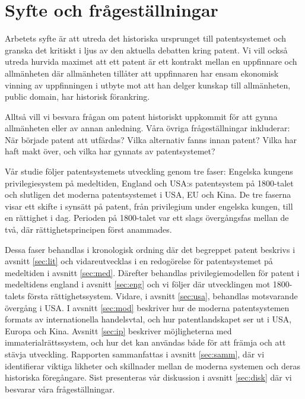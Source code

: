 \section{Syfte och frågeställningar}

Arbetets syfte är att utreda det historiska ursprunget till patentsystemet och
granska det kritiskt i ljus av den aktuella debatten kring patent.
Vi vill också utreda hurvida maximet att ett patent är ett kontrakt mellan en
uppfinnare och allmänheten där allmänheten tillåter att uppfinnaren har ensam
ekonomisk vinning av uppfinningen i utbyte mot att han delger kunskap till
allmänheten, public domain, har historisk förankring.

Alltså vill vi besvara frågan om patent historiskt uppkommit för att gynna
allmänheten eller av annan anledning. Våra övriga frågeställningar inkluderar:
När började patent att utfärdas? Vilka alternativ fanns innan patent?
Vilka har haft makt över, och vilka har gynnats av patentsystemet?

 
 
Vår studie följer patentsystemets utveckling genom tre faser:
Engelska kungens privilegiesystem på medeltiden, England och USA:s patentsystem på 1800-talet och slutligen det moderna patentsystemet i USA, EU och Kina.
De tre faserna visar ett skifte i synsätt på patent, från privilegium under engelska kungen, till en rättighet i dag. Perioden på 1800-talet var ett slags övergångsfas mellan de två, där rättighetsprincipen först anammades.

Dessa faser behandlas i kronologisk ordning där det begreppet patent beskrivs i avsnitt \ref{sec:lit} och vidareutvecklas i en redogörelse för patentsystemet på medeltiden i avsnitt \ref{sec:med}.
Därefter behandlas privilegiemodellen för patent i medeltidens england i avsnitt \ref{sec:eng} och vi följer där utvecklingen mot 1800-talets första rättighetssystem.
Vidare, i avsnitt \ref{sec:usa}, behandlas motsvarande övergång i USA.
I avsnitt \ref{sec:mod} beskriver hur de moderna patentsystemen formats av internationella handelsvtal, och hur patentlandskapet ser ut i USA, Europa och Kina.
Avsnitt \ref{sec:ip} beskriver möjligheterna med immaterialrättssystem, och hur det kan användas både för att främja och att stävja utveckling.
Rapporten sammanfattas i avsnitt \ref{sec:samm}, där vi identifierar viktiga likheter och skillnader mellan de moderna systemen och deras historiska föregångare.
Sist presenteras vår diskussion i avsnitt \ref{sec:disk} där vi besvarar våra frågeställningar.
 
